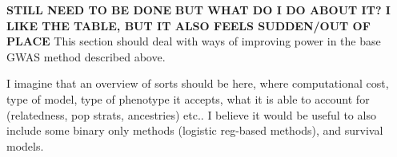 \textbf{STILL NEED TO BE DONE} \textbf{BUT WHAT DO I DO ABOUT IT? I LIKE THE TABLE, BUT IT ALSO FEELS SUDDEN/OUT OF PLACE}
This section should deal with ways of improving power in the base GWAS method described above.

I imagine that an overview of sorts should be here, where computational cost, type of model, type of phenotype it accepts, what it is able to account for (relatedness, pop strats, ancestries) etc.. I believe it would be useful to also include some binary only methods (logistic reg-based methods), and survival models.









